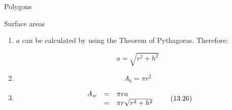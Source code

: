 \begin{exercises}{Polygons}
\begin{exercises}{Surface areas }
{\begin{mdframed}[linewidth=4, leftmargin=40, rightmargin=40]
\begin{exercise}
\begin{enumerate}[noitemsep, label=\textbf{Step} \textbf{\arabic*}. ]
	\begin{figure}[H] %
    \begin{center}
    \label{m39357*id62779!!!underscore!!!media}\label{m39357*id62779!!!underscore!!!printimage}\texttt{[image: col11306.imgs/m39357\_MG11C16\_003.png]} %
        
      \vspace{2pt}
    \vspace{.1in}
    
    \end{center}

 \end{figure}   

    \addtocounter{footnote}{-0}
    
      \par 
      \label{m39357*id62785}This curved surface can be cut into many thin triangles with height close to $a$ ($a$ is called the \textsl{slant height}). The area of these triangles will add up to $\frac{1}{2}\ensuremath{\times}$base$\ensuremath{\times}$height(of a small triangle) which is $\frac{1}{2}\ensuremath{\times}2\pi r\ensuremath{\times}a=\pi ra$\par 
      \item  
      \label{m39357*id62881}$a$ can be calculated by using the Theorem of Pythagoras. Therefore:\par 
      \label{m39357*id62892}\nopagebreak\noindent{}
        
    \begin{equation}
    a=\sqrt{{r}^{2}+{h}^{2}}\tag{13.24}
      \end{equation}
    
      
      \item  
      \label{m39357*id62928}\nopagebreak\noindent{}
        
    \begin{equation}
    {A}_{b}=\pi {r}^{2}\tag{13.25}
      \end{equation}
    
      
      \item  
      \label{m39357*id62960}\nopagebreak\noindent{}
        
    \begin{equation}
    \begin{array}{ccc}\hfill {A}_{w}& =& \pi ra\hfill \\ & =& \pi r\sqrt{{r}^{2}+{h}^{2}}\hfill \end{array}\tag{13.26}
      \end{equation}
    

\end{enumerate}
\end{exercise}
\end{mdframed}}
\end{exercises}
\end{exercises}
